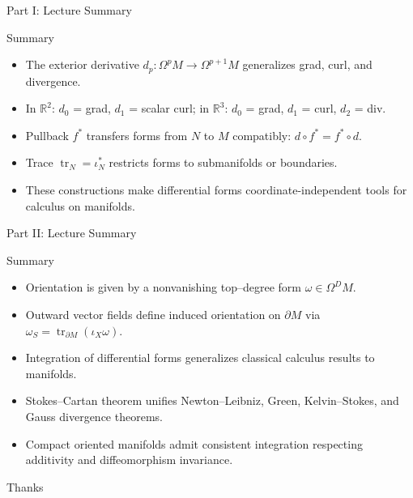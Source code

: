 \begin{frame}{Part I: Lecture Summary}
\begin{block}{Summary}
\begin{itemize}
\item The exterior derivative \(d_p:\Omega^pM\to\Omega^{p+1}M\) generalizes grad, curl, and divergence.
\item In \(\mathbb{R}^2\): \(d_0\) = grad, \(d_1\) = scalar curl; in \(\mathbb{R}^3\): \(d_0\) = grad, \(d_1\) = curl, \(d_2\) = div.
\item Pullback \(f^*\) transfers forms from \(N\) to \(M\) compatibly: \(d\circ f^*=f^*\circ d\).
\item Trace \(\operatorname{tr}_N=\iota_N^*\) restricts forms to submanifolds or boundaries.
\item These constructions make differential forms coordinate-independent tools for calculus on manifolds.
\end{itemize}
\end{block}
\end{frame}

\begin{frame}{Part II: Lecture Summary}
\begin{block}{Summary}
\begin{itemize}
\item Orientation is given by a nonvanishing top–degree form $\omega\in\Omega^D M$.
\item Outward vector fields define induced orientation on $\partial M$ via $\omega_S=\operatorname{tr}_{\partial M}(\iota_X\omega)$.
\item Integration of differential forms generalizes classical calculus results to manifolds.
\item Stokes–Cartan theorem unifies Newton–Leibniz, Green, Kelvin–Stokes, and Gauss divergence theorems.
\item Compact oriented manifolds admit consistent integration respecting additivity and diffeomorphism invariance.
\end{itemize}
\end{block}
\end{frame}


\begin{frame}{Thanks}
  \cmcendframe
\end{frame}


